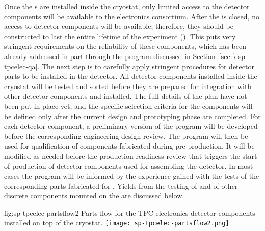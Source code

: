 Once the s are installed inside the cryostat, only
limited access to the detector components will be available to the  electronics
consortium. After the  is closed, no access to detector
components will be available; therefore, they should be constructed to
last the entire lifetime of the experiment (\dunelifetime). This
puts very stringent requirements on the reliability of these
components, which has been already addressed in part through 
the  program discussed in Section~\ref{sec:fdsp-tpcelec-qa}. The
next step is to carefully apply stringent  procedures for  
detector parts to be installed in the detector.
All detector components installed inside the cryostat will
be tested and sorted before they are prepared for integration
with other detector components and installed. The full
details of the  plan have not been put in place
yet, and the specific selection criteria for the components will
be defined only after the current design and
prototyping phase are completed. For each detector component, a preliminary
version of the  program will be developed before the corresponding 
engineering design review. The program will then be used for
qualification of components fabricated during 
pre-production. It will be modified as needed before the production
readiness review that triggers the start of production of detector components
used for assembling the detector. In most cases the  program
will be informed by the experience gained with the tests of the corresponding
parts fabricated for . Yields from the testing of 
and of other discrete components mounted on the  are discussed 
below. 

\begin{dunefigure}
{fig:sp-tpcelec-partsflow2}
{Parts flow for the TPC electronics detector components installed on top of the cryostat.}
\texttt{[image: sp-tpcelec-partsflow2.png]}
\end{dunefigure}

